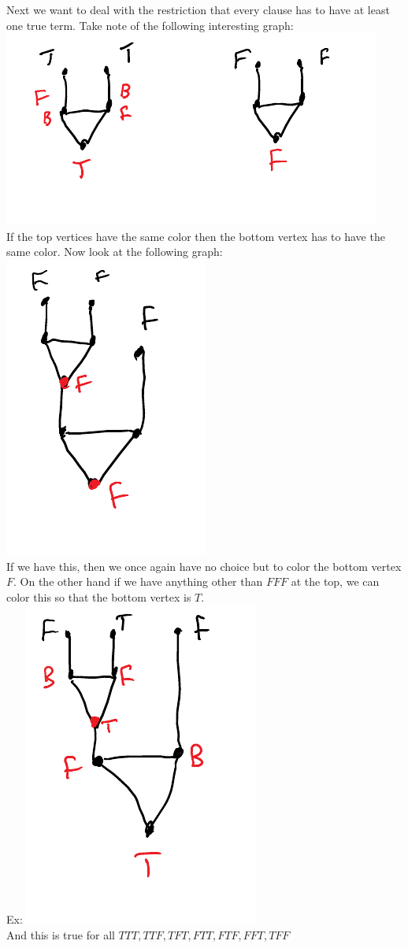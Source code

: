 \documentclass[12 pt]{article}
\begin{document}
          Next we want to deal with the restriction that every clause
          has to have at least one true term. Take note of the
          following interesting graph:
          \\ \includegraphics[width=.9\textwidth]{i136.pdf}\\
          If the top vertices have the same color then the bottom
          vertex has to have the same color. Now look at the following
          graph:
          \\ \includegraphics[width=.4\textwidth]{i137.pdf}
          \\If we have this, then we once again have no choice but to
          color the bottom vertex $F$. On the other hand if we have
          anything other than $FFF$ at the top, we can color this so
          that the bottom vertex is $T$.
          \\ Ex: \includegraphics[width=.4\textwidth]{i138.pdf}
          \\ And this is true for all $TTT, TTF, TFT, FTT, FTF, FFT,
          TFF$
\end{document}
